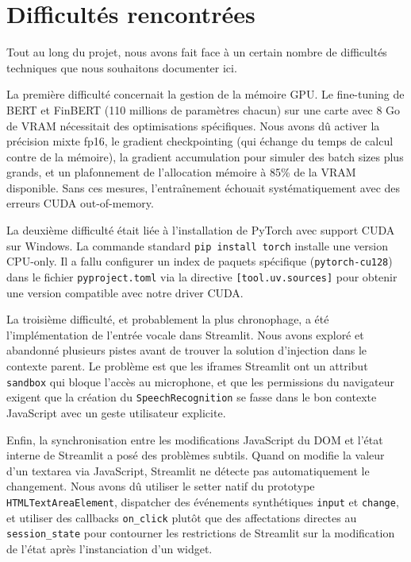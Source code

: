 \documentclass[12pt, a4paper]{article}
\begin{document}
\section{Difficultés rencontrées}

Tout au long du projet, nous avons fait face à un certain nombre de difficultés
techniques que nous souhaitons documenter ici.

La première difficulté concernait la gestion de la mémoire GPU. Le fine-tuning de
BERT et FinBERT (110 millions de paramètres chacun) sur une carte avec 8 Go de
VRAM nécessitait des optimisations spécifiques. Nous avons dû activer la précision
mixte fp16, le gradient checkpointing (qui échange du temps de calcul contre de la
mémoire), la gradient accumulation pour simuler des batch sizes plus grands, et un
plafonnement de l'allocation mémoire à 85\% de la VRAM disponible. Sans ces mesures,
l'entraînement échouait systématiquement avec des erreurs CUDA out-of-memory.

La deuxième difficulté était liée à l'installation de PyTorch avec support CUDA
sur Windows. La commande standard \texttt{pip install torch} installe une version
CPU-only. Il a fallu configurer un index de paquets spécifique (\texttt{pytorch-cu128})
dans le fichier \texttt{pyproject.toml} via la directive \texttt{[tool.uv.sources]}
pour obtenir une version compatible avec notre driver CUDA.

La troisième difficulté, et probablement la plus chronophage, a été l'implémentation
de l'entrée vocale dans Streamlit. Nous avons exploré et abandonné plusieurs pistes
avant de trouver la solution d'injection dans le contexte parent. Le problème est
que les iframes Streamlit ont un attribut \texttt{sandbox} qui bloque l'accès au
microphone, et que les permissions du navigateur exigent que la création du
\texttt{SpeechRecognition} se fasse dans le bon contexte JavaScript avec un geste
utilisateur explicite.

Enfin, la synchronisation entre les modifications JavaScript du DOM et l'état interne
de Streamlit a posé des problèmes subtils. Quand on modifie la valeur d'un textarea
via JavaScript, Streamlit ne détecte pas automatiquement le changement. Nous avons dû
utiliser le setter natif du prototype \texttt{HTMLTextAreaElement}, dispatcher des
événements synthétiques \texttt{input} et \texttt{change}, et utiliser des callbacks
\texttt{on\_click} plutôt que des affectations directes au \texttt{session\_state}
pour contourner les restrictions de Streamlit sur la modification de l'état après
l'instanciation d'un widget.
\end{document}

